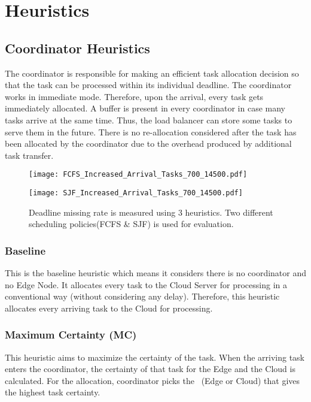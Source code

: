 \section{Heuristics}\label{heuristcic}
\subsection{\textbf{Coordinator Heuristics}}
The coordinator is responsible for making an efficient task allocation decision so that the task can be processed within its individual deadline. The coordinator works in immediate mode. Therefore, upon the arrival, every task gets immediately allocated.  A buffer is present in every coordinator in case many tasks arrive at the same time. Thus, the load balancer can store some tasks to serve them in the future. There is no re-allocation considered after the task has been allocated by the coordinator due to the overhead produced by additional task transfer.

\begin{figure*}[h]
	\centering
	\begin{minipage}[b]{0.49\linewidth}
		\texttt{[image: FCFS\_Increased\_Arrival\_Tasks\_700\_14500.pdf]}
	\end{minipage}
	\hfill
	\begin{minipage}[b]{0.49\linewidth}
		\texttt{[image: SJF\_Increased\_Arrival\_Tasks\_700\_14500.pdf]}
	\end{minipage}
	\caption{Deadline missing rate is measured using 3 heuristics. Two different scheduling policies(FCFS \& SJF) is used for evaluation.}
\end{figure*} 

\subsubsection{\textbf{Baseline}}
This is the baseline heuristic which means it considers there is no coordinator and no Edge Node. It allocates every task to the Cloud Server for processing in a conventional way (without considering any delay). Therefore, this heuristic allocates every arriving task to the Cloud for processing.    

\subsubsection{\textbf{Maximum Certainty (MC)}}
This heuristic aims to maximize the certainty of the task. When the arriving task enters the coordinator, the certainty of that task for the Edge and the Cloud is calculated. For the allocation, coordinator picks the \pu~(Edge or Cloud) that gives the highest task certainty.

